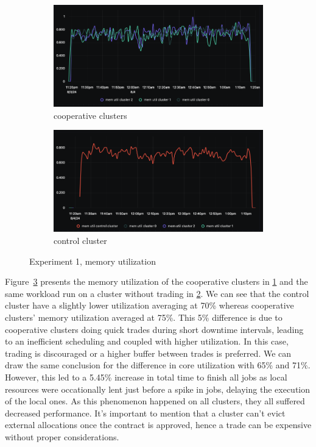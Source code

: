 \begin{figure}[H]
\centering
\begin{subfigure}{.5\textwidth}
  \centering
  \includegraphics[width=.9\linewidth]{./figures/experiment-one/cooperative-clusters-all-at-100-trading-mem-util.png}
  \caption{cooperative clusters}
  \label{fig:exp1coop}
\end{subfigure}%
\begin{subfigure}{.5\textwidth}
  \centering
  \includegraphics[width=.9\linewidth]{./figures/experiment-one/control-mem-util.png}
  \caption{control cluster}
  \label{fig:exp1control}
\end{subfigure}
\caption{Experiment 1, memory utilization}
\label{fig:exp1memutil}
\end{figure}

Figure~\ref{fig:exp1memutil} presents the memory utilization of the cooperative
clusters in \ref{fig:exp1coop} and the same workload run on a cluster without
trading in \ref{fig:exp1control}.
We can see that the control cluster have a slightly lower utilization averaging
at 70\% whereas cooperative clusters' memory utilization averaged at 75\%. This
5\% difference is due to cooperative clusters doing quick trades during short
downtime intervals, leading to an inefficient scheduling and coupled with
higher utilization. In this case, trading is discouraged or a higher buffer
between trades is preferred. We can draw the same conclusion for the difference
in core utilization with 65\% and 71\%. However, this led to a 5.45\% increase
in total time to finish all jobs as local resources were occationally lent
just before a spike in jobs, delaying the execution of the local ones. As this
phenomenon happened on all clusters, they all suffered decreased performance.
It's important to mention that a cluster can't evict external allocations once
the contract is approved, hence a trade can be expensive without proper
considerations.

